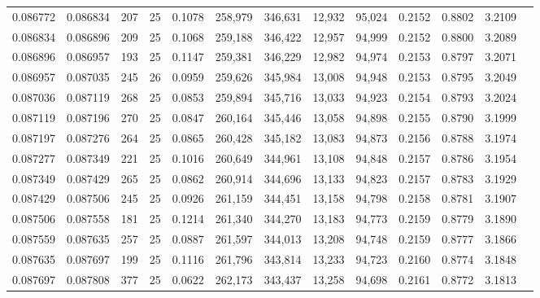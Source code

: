 \begin{tabular}{rrrrrrrrrrrrr}
0.086772 & 0.086834 &   207 &  25 &                                     0.1078 & 258,979 & 346,631 &  12,932 &  95,024 & 0.2152 & 0.8802 & 3.2109 \\
0.086834 & 0.086896 &   209 &  25 &                                     0.1068 & 259,188 & 346,422 &  12,957 &  94,999 & 0.2152 & 0.8800 & 3.2089 \\
0.086896 & 0.086957 &   193 &  25 &                                     0.1147 & 259,381 & 346,229 &  12,982 &  94,974 & 0.2153 & 0.8797 & 3.2071 \\
0.086957 & 0.087035 &   245 &  26 &                                     0.0959 & 259,626 & 345,984 &  13,008 &  94,948 & 0.2153 & 0.8795 & 3.2049 \\
0.087036 & 0.087119 &   268 &  25 &                                     0.0853 & 259,894 & 345,716 &  13,033 &  94,923 & 0.2154 & 0.8793 & 3.2024 \\
0.087119 & 0.087196 &   270 &  25 &                                     0.0847 & 260,164 & 345,446 &  13,058 &  94,898 & 0.2155 & 0.8790 & 3.1999 \\
0.087197 & 0.087276 &   264 &  25 &                                     0.0865 & 260,428 & 345,182 &  13,083 &  94,873 & 0.2156 & 0.8788 & 3.1974 \\
0.087277 & 0.087349 &   221 &  25 &                                     0.1016 & 260,649 & 344,961 &  13,108 &  94,848 & 0.2157 & 0.8786 & 3.1954 \\
0.087349 & 0.087429 &   265 &  25 &                                     0.0862 & 260,914 & 344,696 &  13,133 &  94,823 & 0.2157 & 0.8783 & 3.1929 \\
0.087429 & 0.087506 &   245 &  25 &                                     0.0926 & 261,159 & 344,451 &  13,158 &  94,798 & 0.2158 & 0.8781 & 3.1907 \\
0.087506 & 0.087558 &   181 &  25 &                                     0.1214 & 261,340 & 344,270 &  13,183 &  94,773 & 0.2159 & 0.8779 & 3.1890 \\
0.087559 & 0.087635 &   257 &  25 &                                     0.0887 & 261,597 & 344,013 &  13,208 &  94,748 & 0.2159 & 0.8777 & 3.1866 \\
0.087635 & 0.087697 &   199 &  25 &                                     0.1116 & 261,796 & 343,814 &  13,233 &  94,723 & 0.2160 & 0.8774 & 3.1848 \\
0.087697 & 0.087808 &   377 &  25 &                                     0.0622 & 262,173 & 343,437 &  13,258 &  94,698 & 0.2161 & 0.8772 & 3.1813 \\

\end{tabular}
